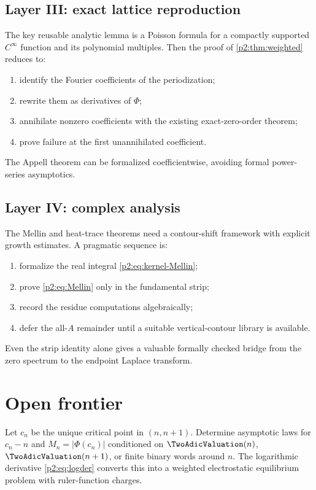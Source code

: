 \documentclass[11pt]{article}
\numberwithin{equation}{section}
\theoremstyle{definition}
\theoremstyle{remark}
\begin{document}
\subsection{Layer III: exact lattice reproduction}

The key reusable analytic lemma is a Poisson formula for a compactly supported
$C^\infty$ function and its polynomial multiples.  Then the proof of
\cref{p2:thm:weighted} reduces to:
\begin{enumerate}
\item identify the Fourier coefficients of the periodization;
\item rewrite them as derivatives of $\Phi$;
\item annihilate nonzero coefficients with the existing exact-zero-order theorem;
\item prove failure at the first unannihilated coefficient.
\end{enumerate}
The Appell theorem can be formalized coefficientwise, avoiding formal power-series
asymptotics.

\subsection{Layer IV: complex analysis}

The Mellin and heat-trace theorems need a contour-shift framework with explicit
growth estimates.  A pragmatic sequence is:
\begin{enumerate}
\item formalize the real integral \eqref{p2:eq:kernel-Mellin};
\item prove \eqref{p2:eq:Mellin} only in the fundamental strip;
\item record the residue computations algebraically;
\item defer the all-$A$ remainder until a suitable vertical-contour library is
      available.
\end{enumerate}
Even the strip identity alone gives a valuable formally checked bridge from the
zero spectrum to the endpoint Laplace transform.

\section{Open frontier}
\label{p2:sec:open}

\begin{problem}
Let $c_n$ be the unique critical point in $(n,n+1)$.  Determine asymptotic laws
for $c_n-n$ and $M_n=|\Phi(c_n)|$ conditioned on $\TwoAdicValuation(n)$, $\TwoAdicValuation(n+1)$, or
finite binary words around $n$.  The logarithmic derivative
\eqref{p2:eq:logder} converts this into a weighted electrostatic equilibrium problem
with ruler-function charges.
\end{problem}
\end{document}

